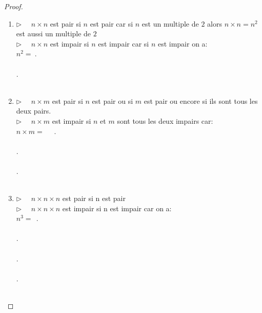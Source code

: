 \documentclass[a4paper,10.5pt]{article}
\begin{document}
\begin{proof}\hfil \\
	\begin{enumerate}
		\item $\triangleright$~~ $n\times n$ est pair si $n $ est pair car si $n$ est un multiple de $2$ alors $n\times n = n^2$ est aussi un multiple de $2$\\[4mm] 
		$\triangleright$ ~~$n\times n$ est impair si $n $ est impair car si $n $ est impair on a: \\[4mm]$n^2 = \  $\noindent.\dotfill \\ \\%
		\noindent.\dotfill \\ \\
	
		
		\item $\triangleright$ ~~$n\times m$ est pair si $n $ est pair ou si $m$ est pair ou encore si ils sont tous les deux pairs.\\[4mm]
		$\triangleright$~~ $n\times m$ est impair si $n$ et $m$ sont tous les deux impairs car:\\[4mm]$n\times m=$ \ \ \noindent.\dotfill \\ \\%
		\noindent.\dotfill \\ \\
		\noindent.\dotfill \\ \\
		
		\item $\triangleright$~~ $n\times n\times n$ est pair si n est pair \\[4mm]
		$\triangleright$~~ $n\times n\times n$ est impair si n est impair car on a:\\[4mm] $n^3 = \ \ $\noindent.\dotfill \\ \\
		\noindent.\dotfill \\ \\\noindent.\dotfill \\ \\\noindent.\dotfill \\ \\%
	\end{enumerate}
\end{proof}
\newpage
\end{document}
